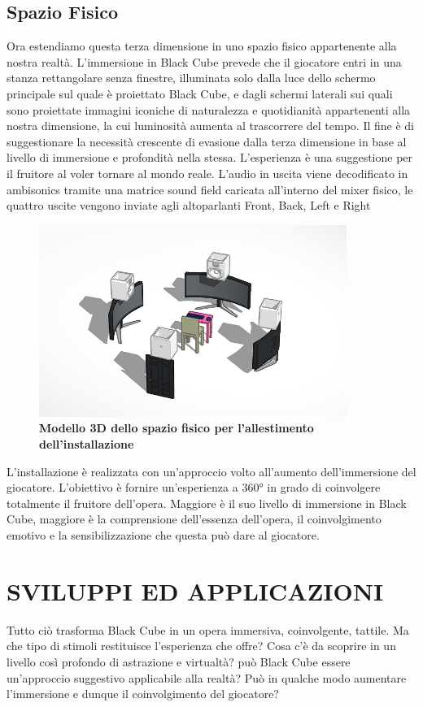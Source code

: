 	\subsection{Spazio Fisico}
	Ora estendiamo questa terza dimensione in uno spazio fisico appartenente alla nostra realtà. L'immersione in Black Cube prevede che il giocatore entri in una stanza rettangolare senza finestre, illuminata solo dalla luce dello schermo principale sul quale è proiettato Black Cube, e dagli schermi laterali sui quali sono proiettate immagini iconiche di naturalezza e quotidianità appartenenti alla nostra dimensione, la cui luminosità aumenta al trascorrere del tempo.
	Il fine è di suggestionare la necessità crescente di evasione dalla terza dimensione in base al livello di immersione e profondità nella stessa. L'esperienza è una suggestione per il fruitore al voler tornare al mondo reale.
	L'audio in uscita viene decodificato in ambisonics tramite una matrice sound field caricata all'interno del mixer fisico, le quattro uscite vengono inviate agli altoparlanti Front, Back, Left e Right
	
	\begin{figure}[h]
		\begin{center}
			\includegraphics[width=10cm]{img/image1.png}
			\caption{\textbf{Modello 3D dello spazio fisico per l'allestimento dell'installazione}}
				\label{gr01}
		\end{center}
	\end{figure}

L'installazione è realizzata con un'approccio volto all'aumento dell'immersione del giocatore. L'obiettivo è fornire un'esperienza a 360° in grado di coinvolgere totalmente il fruitore dell'opera. Maggiore è il suo livello di immersione in Black Cube, maggiore è la comprensione dell'essenza dell'opera, il coinvolgimento emotivo e la sensibilizzazione che questa può dare al giocatore.
	
\section{SVILUPPI ED APPLICAZIONI}
Tutto ciò trasforma Black Cube in un opera immersiva, coinvolgente, tattile. Ma che tipo di stimoli restituisce l'esperienza che offre? Cosa c'è da scoprire in un livello così profondo di astrazione e virtualtà? può Black Cube essere un'approccio suggestivo applicabile alla realtà? Può in qualche modo aumentare l'immersione e dunque il coinvolgimento del giocatore?

